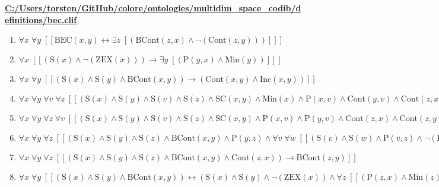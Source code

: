 \documentclass{article}
\begin{document}
\textbf{\url{C:/Users/torsten/GitHub/colore/ontologies/multidim\_space\_codib/definitions/bec.clif}}

\begin{enumerate}
\item $\forall x\; \forall y\;  \left[ \left[ \textrm{BEC}(x,y) \leftrightarrow \exists z\;  \left[ \left(\textrm{BCont}(z,x) \land \neg \left(\textrm{Cont}(z,y)\right)\right) \right] \right] \right]$
\item $\forall x\;  \left[ \left[ \left(\textrm{S}(x) \land \neg \left(\textrm{ZEX}(x)\right)\right) \rightarrow \exists y\;  \left[ \left(\textrm{P}(y,x) \land \textrm{Min}(y)\right) \right] \right] \right]$
\item $\forall x\; \forall y\;  \left[ \left[ \left(\textrm{S}(x) \land \textrm{S}(y) \land \textrm{BCont}(x,y)\right) \rightarrow \left(\textrm{Cont}(x,y) \land \textrm{Inc}(x,y)\right) \right] \right]$
\item $\forall x\; \forall y\; \forall v\; \forall z\;  \left[ \left[ \left(\textrm{S}(x) \land \textrm{S}(y) \land \textrm{S}(v) \land \textrm{S}(z) \land \textrm{SC}(x,y) \land \textrm{Min}(x) \land \textrm{P}(x,v) \land \textrm{Cont}(y,v) \land \textrm{Cont}(z,x) \land \textrm{Cont}(z,y)\right) \rightarrow \textrm{BCont}(z,x) \right] \right]$
\item $\forall x\; \forall y\; \forall z\; \forall v\;  \left[ \left[ \left(\textrm{S}(x) \land \textrm{S}(y) \land \textrm{S}(v) \land \textrm{S}(z) \land \textrm{SC}(x,y) \land \textrm{P}(x,v) \land \textrm{P}(y,v) \land \textrm{Cont}(z,x) \land \textrm{Cont}(z,y) \land \textrm{Covers}(v,z)\right) \rightarrow \neg \left(\textrm{BCont}(z,v)\right) \right] \right]$
\item $\forall x\; \forall y\; \forall z\;  \left[ \left[ \left(\textrm{S}(x) \land \textrm{S}(y) \land \textrm{S}(z) \land \textrm{BCont}(x,y) \land \textrm{P}(y,z) \land \forall v\; \forall w\;  \left[ \left[ \left(\textrm{S}(v) \land \textrm{S}(w) \land \textrm{P}(v,z) \land \neg \left(\textrm{PO}(v,y)\right) \land \textrm{P}(w,x)\right) \rightarrow \neg \left(\textrm{Cont}(w,v)\right) \right] \right]\right) \rightarrow \textrm{BCont}(x,z) \right] \right]$
\item $\forall x\; \forall y\; \forall z\;  \left[ \left[ \left(\textrm{S}(x) \land \textrm{S}(y) \land \textrm{S}(z) \land \textrm{BCont}(x,y) \land \textrm{Cont}(z,x)\right) \rightarrow \textrm{BCont}(z,y) \right] \right]$
\item $\forall x\; \forall y\;  \left[ \left[ \left(\textrm{S}(x) \land \textrm{S}(y) \land \textrm{BCont}(x,y)\right) \leftrightarrow \left(\textrm{S}(x) \land \textrm{S}(y) \land \neg \left(\textrm{ZEX}(x)\right) \land \forall z\;  \left[ \left[ \left(\textrm{P}(z,x) \land \textrm{Min}(z)\right) \rightarrow \textrm{BCont}(z,y) \right] \right]\right) \right] \right]$

\end{enumerate}
\end{document}
